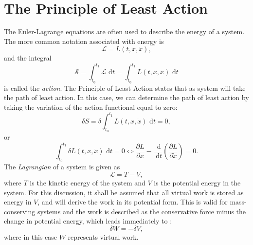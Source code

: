 \section{The Principle of Least Action}
The Euler-Lagrange equations are often used to describe the energy of a system. The more common notation associated with energy is
\begin{equation}
\mathcal L = L(t,x,\dot x),
\end{equation}
and the integral
\begin{equation}
\mathcal S = \int_{t_0}^{t_1}\mathcal L\text{ d}t = \int_{t_0}^{t_1}L(t,x,\dot x)\text{ d}t
\end{equation}
is called the \emph{action}. The Principle of Least Action states that as system will take the path of least action. In this case, we can determine the path of least action by taking the variation of the action functional equal to zero:
\begin{equation}
\delta S = \delta \int_{t_0}^{t_1}L(t,x,\dot x)\text{ d}t = 0,
\end{equation}
or 
\begin{equation}
\int_{t_0}^{t_1}\delta L(t,x,\dot x)\text{ d}t = 0 \Leftrightarrow \frac{\partial L}{\partial x}-\frac{\text{ d}}{\text{ d}t}\left(\frac{\partial L}{\partial \dot x}\right) = 0.
\end{equation}
The \emph{Lagrangian} of a system is given as 
\begin{equation}
\mathcal L = T-V,
\end{equation}
where $T$ is the kinetic energy of the system and $V$ is the potential energy in the system. For this discussion, it shall be assumed that all virtual work is stored as energy in $V$, and will derive the work in its potential form. This is valid for mass-conserving systems and the work is described as the conservative force minus the change in potential energy, which leads immediately to \cite{petyt1990introduction}:
\begin{equation}
\delta W = -\delta V,
\end{equation}
where in this case $W$ represents virtual work.

